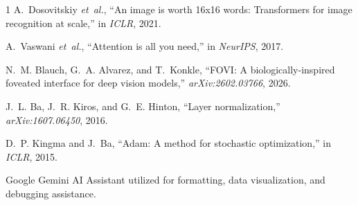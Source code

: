 \documentclass[10pt,conference]{IEEEtran}
\begin{document}
\begin{thebibliography}{1}
A.~Dosovitskiy \emph{et~al.}, ``An image is worth 16x16 words: Transformers for image recognition at scale,'' in \emph{ICLR}, 2021.

A.~Vaswani \emph{et~al.}, ``Attention is all you need,'' in \emph{NeurIPS}, 2017.

N.~M. Blauch, G.~A. Alvarez, and T.~Konkle, ``FOVI: A biologically-inspired foveated interface for deep vision models,'' \emph{arXiv:2602.03766}, 2026.

J.~L. Ba, J.~R. Kiros, and G.~E. Hinton, ``Layer normalization,'' \emph{arXiv:1607.06450}, 2016.

D.~P. Kingma and J.~Ba, ``Adam: A method for stochastic optimization,'' in \emph{ICLR}, 2015.

Google Gemini AI Assistant utilized for formatting, data visualization, and debugging assistance.
\end{thebibliography}
\end{document}
